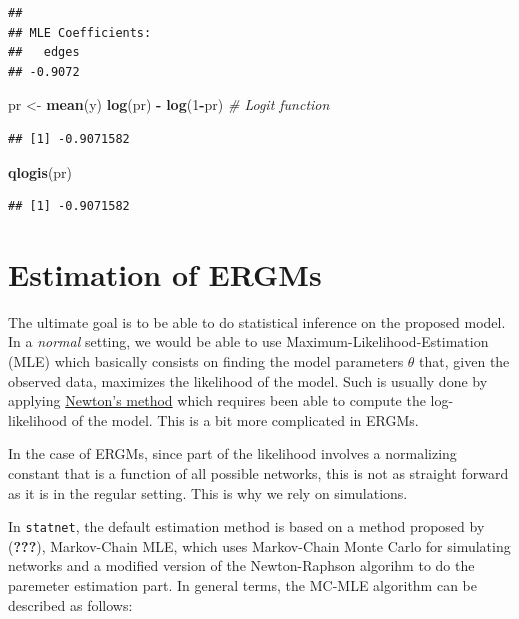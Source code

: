 \documentclass[]{book}
\newenvironment{Shaded}{\begin{snugshade}}{\end{snugshade}}
\newcommand{\KeywordTok}[1]{\textcolor[rgb]{0.13,0.29,0.53}{\textbf{#1}}}
\newcommand{\DecValTok}[1]{\textcolor[rgb]{0.00,0.00,0.81}{#1}}
\newcommand{\StringTok}[1]{\textcolor[rgb]{0.31,0.60,0.02}{#1}}
\newcommand{\CommentTok}[1]{\textcolor[rgb]{0.56,0.35,0.01}{\textit{#1}}}
\newcommand{\OperatorTok}[1]{\textcolor[rgb]{0.81,0.36,0.00}{\textbf{#1}}}
\newcommand{\NormalTok}[1]{#1}
\theoremstyle{definition}
\theoremstyle{definition}
\theoremstyle{definition}
\theoremstyle{remark}
\begin{document}
\begin{verbatim}
## 
## MLE Coefficients:
##   edges  
## -0.9072
\end{verbatim}

\begin{Shaded}
\begin{Highlighting}[]
\NormalTok{pr <-}\StringTok{ }\KeywordTok{mean}\NormalTok{(y)}
\KeywordTok{log}\NormalTok{(pr) }\OperatorTok{-}\StringTok{ }\KeywordTok{log}\NormalTok{(}\DecValTok{1}\OperatorTok{-}\NormalTok{pr) }\CommentTok{# Logit function}
\end{Highlighting}
\end{Shaded}

\begin{verbatim}
## [1] -0.9071582
\end{verbatim}

\begin{Shaded}
\begin{Highlighting}[]
\KeywordTok{qlogis}\NormalTok{(pr)}
\end{Highlighting}
\end{Shaded}

\begin{verbatim}
## [1] -0.9071582
\end{verbatim}

\section{Estimation of ERGMs}\label{estimation-of-ergms}

The ultimate goal is to be able to do statistical inference on the
proposed model. In a \emph{normal} setting, we would be able to use
Maximum-Likelihood-Estimation (MLE) which basically consists on finding
the model parameters \(\theta\) that, given the observed data, maximizes
the likelihood of the model. Such is usually done by applying
\href{https://en.wikipedia.org/wiki/Newton\%27s_method_in_optimization}{Newton's
method} which requires been able to compute the log-likelihood of the
model. This is a bit more complicated in ERGMs.

In the case of ERGMs, since part of the likelihood involves a
normalizing constant that is a function of all possible networks, this
is not as straight forward as it is in the regular setting. This is why
we rely on simulations.

In \texttt{statnet}, the default estimation method is based on a method
proposed by ({\textbf{???}}), Markov-Chain MLE, which uses Markov-Chain
Monte Carlo for simulating networks and a modified version of the
Newton-Raphson algorihm to do the paremeter estimation part. In general
terms, the MC-MLE algorithm can be described as follows:
\end{document}
